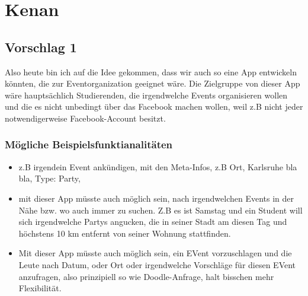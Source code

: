 \section{Kenan}

\subsection{Vorschlag 1}
Also heute bin ich auf die Idee gekommen, dass wir auch so eine App entwickeln könnten, die zur Eventorganization geeignet wäre. Die Zielgruppe von dieser App wäre hauptsächlich Studierenden, die irgendwelche Events organisieren wollen und die es nicht unbedingt über das Facebook machen wollen, weil z.B nicht jeder notwendigerweise Facebook-Account besitzt. 

\subsubsection{Mögliche Beispielsfunktianalitäten}
\begin{itemize}
\item z.B irgendein Event ankündigen, mit den Meta-Infos, z.B Ort, Karlsruhe bla bla, Type: Party, 
\item mit dieser App müsste auch möglich sein, nach irgendwelchen Events in der Nähe bzw. wo auch immer zu suchen. Z.B es ist Samstag und ein Student will sich irgendwelche Partys angucken, die in seiner Stadt am diesen Tag und höchstens 10 km entfernt von seiner Wohnung stattfinden. 
\item Mit dieser App müsste auch möglich sein, ein EVent vorzuschlagen und die Leute nach Datum, oder Ort oder irgendwelche Vorschläge für diesen EVent anzufragen, also prinzipiell so wie Doodle-Anfrage, halt bisschen mehr Flexibilität. 
\end{itemize}